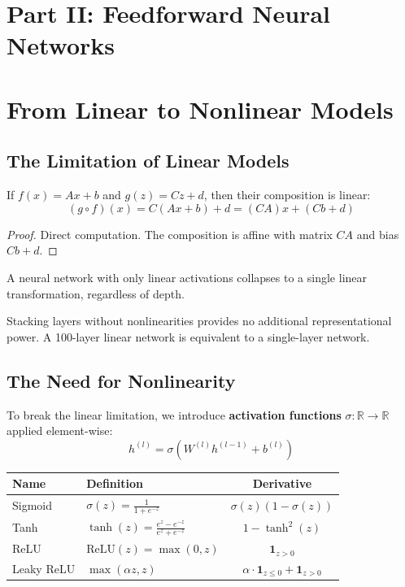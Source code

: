 \documentclass[main.tex]{subfiles}
\begin{document}
\newpage
\section*{\Huge\textcolor{mantis}{Part II: Feedforward Neural Networks}}

\needspace{0.33\textheight}
\section{From Linear to Nonlinear Models}

\subsection{The Limitation of Linear Models}

\begin{theorem}
If $f(x) = Ax + b$ and $g(z) = Cz + d$, then their composition is linear:
$$(g \circ f)(x) = C(Ax + b) + d = (CA)x + (Cb + d)$$
\end{theorem}

\begin{proof}
Direct computation. The composition is affine with matrix $CA$ and bias $Cb + d$.
\end{proof}

\begin{corollary}
A neural network with only linear activations collapses to a single linear transformation, regardless of depth.
\end{corollary}

Stacking layers without nonlinearities provides no additional representational power. A 100-layer linear network is equivalent to a single-layer network.

\subsection{The Need for Nonlinearity}

To break the linear limitation, we introduce \textbf{activation functions} $\sigma: \mathbb{R} \to \mathbb{R}$ applied element-wise:
$$h^{(l)} = \sigma(W^{(l)} h^{(l-1)} + b^{(l)})$$

\begin{center}
\begin{tabular}{llc}
\hline
\textbf{Name} & \textbf{Definition} & \textbf{Derivative} \\
\hline
Sigmoid & $\sigma(z) = \frac{1}{1+e^{-z}}$ & $\sigma(z)(1-\sigma(z))$ \\[6pt]
Tanh & $\tanh(z) = \frac{e^z - e^{-z}}{e^z + e^{-z}}$ & $1 - \tanh^2(z)$ \\[6pt]
ReLU & $\text{ReLU}(z) = \max(0, z)$ & $\mathbf{1}_{z > 0}$ \\[6pt]
Leaky ReLU & $\max(\alpha z, z)$ & $\alpha \cdot \mathbf{1}_{z \leq 0} + \mathbf{1}_{z > 0}$ \\
\hline
\end{tabular}
\end{center}
\end{document}
